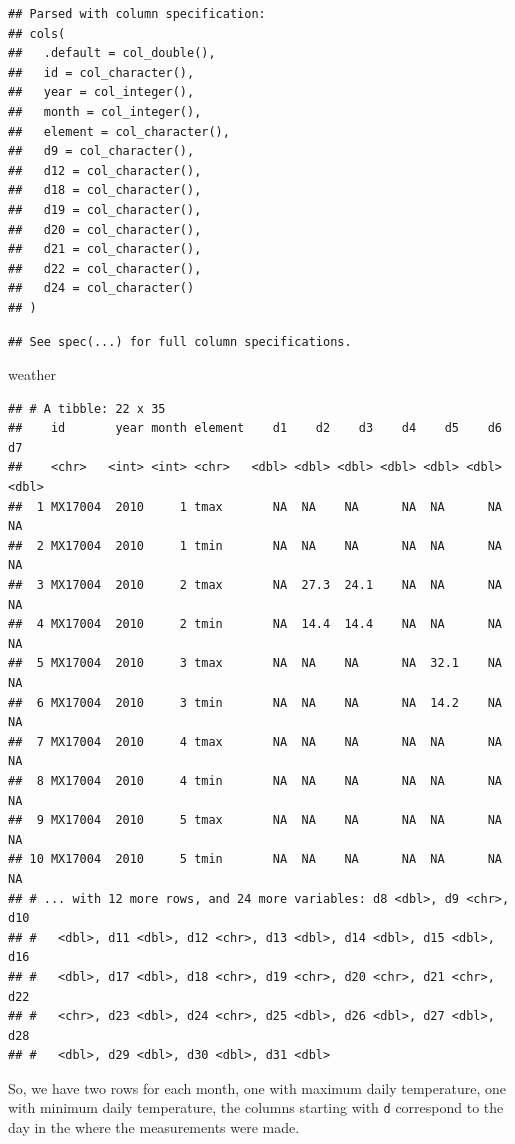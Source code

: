 \documentclass[12pt,]{book}
\newenvironment{Shaded}{\begin{snugshade}}{\end{snugshade}}
\newcommand{\NormalTok}[1]{#1}
\theoremstyle{definition}
\theoremstyle{definition}
\theoremstyle{definition}
\theoremstyle{remark}
\begin{document}
\begin{verbatim}
## Parsed with column specification:
## cols(
##   .default = col_double(),
##   id = col_character(),
##   year = col_integer(),
##   month = col_integer(),
##   element = col_character(),
##   d9 = col_character(),
##   d12 = col_character(),
##   d18 = col_character(),
##   d19 = col_character(),
##   d20 = col_character(),
##   d21 = col_character(),
##   d22 = col_character(),
##   d24 = col_character()
## )
\end{verbatim}

\begin{verbatim}
## See spec(...) for full column specifications.
\end{verbatim}

\begin{Shaded}
\begin{Highlighting}[]
\NormalTok{weather}
\end{Highlighting}
\end{Shaded}

\begin{verbatim}
## # A tibble: 22 x 35
##    id       year month element    d1    d2    d3    d4    d5    d6    d7
##    <chr>   <int> <int> <chr>   <dbl> <dbl> <dbl> <dbl> <dbl> <dbl> <dbl>
##  1 MX17004  2010     1 tmax       NA  NA    NA      NA  NA      NA    NA
##  2 MX17004  2010     1 tmin       NA  NA    NA      NA  NA      NA    NA
##  3 MX17004  2010     2 tmax       NA  27.3  24.1    NA  NA      NA    NA
##  4 MX17004  2010     2 tmin       NA  14.4  14.4    NA  NA      NA    NA
##  5 MX17004  2010     3 tmax       NA  NA    NA      NA  32.1    NA    NA
##  6 MX17004  2010     3 tmin       NA  NA    NA      NA  14.2    NA    NA
##  7 MX17004  2010     4 tmax       NA  NA    NA      NA  NA      NA    NA
##  8 MX17004  2010     4 tmin       NA  NA    NA      NA  NA      NA    NA
##  9 MX17004  2010     5 tmax       NA  NA    NA      NA  NA      NA    NA
## 10 MX17004  2010     5 tmin       NA  NA    NA      NA  NA      NA    NA
## # ... with 12 more rows, and 24 more variables: d8 <dbl>, d9 <chr>, d10
## #   <dbl>, d11 <dbl>, d12 <chr>, d13 <dbl>, d14 <dbl>, d15 <dbl>, d16
## #   <dbl>, d17 <dbl>, d18 <chr>, d19 <chr>, d20 <chr>, d21 <chr>, d22
## #   <chr>, d23 <dbl>, d24 <chr>, d25 <dbl>, d26 <dbl>, d27 <dbl>, d28
## #   <dbl>, d29 <dbl>, d30 <dbl>, d31 <dbl>
\end{verbatim}

So, we have two rows for each month, one with maximum daily temperature,
one with minimum daily temperature, the columns starting with \texttt{d}
correspond to the day in the where the measurements were made.
\end{document}
